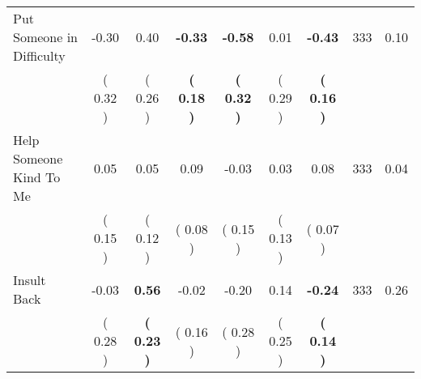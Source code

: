 \begin{tabular}{lcccccccc}
Put Someone in Difficulty &     -0.30 &      0.40 & \textbf{    -0.33} & \textbf{    -0.58} &      0.01 & \textbf{    -0.43} & 333 &       0.10 \\ 
 & (     0.32 ) & (     0.26 ) & \textbf{(     0.18 )} & \textbf{(     0.32 )} & (     0.29 ) & \textbf{(     0.16 )} & \\
Help Someone Kind To Me &      0.05 &      0.05 &      0.09 &     -0.03 &      0.03 &      0.08 & 333 &       0.04 \\ 
 & (     0.15 ) & (     0.12 ) & (     0.08 ) & (     0.15 ) & (     0.13 ) & (     0.07 ) & \\
Insult Back &     -0.03 & \textbf{     0.56} &     -0.02 &     -0.20 &      0.14 & \textbf{    -0.24} & 333 &       0.26 \\ 
 & (     0.28 ) & \textbf{(     0.23 )} & (     0.16 ) & (     0.28 ) & (     0.25 ) & \textbf{(     0.14 )} & \\
\bottomrule
\end{tabular}
